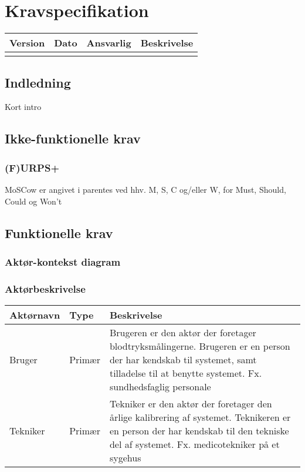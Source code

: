 \chapter{Kravspecifikation}

\begin{longtabu} to 
    Version &    Dato &    Ansvarlig &    Beskrivelse\\[-1ex]
    \midrule
\label{version_Systemark}
\end{longtabu}


\section{Indledning}

Kort intro
\section{Ikke-funktionelle krav}
\subsection{(F)URPS+}
MoSCow er angivet i parentes ved hhv. M, S, C og/eller W, for Must, Should, Could og Won't\\
\section{Funktionelle krav}
\subsection{Aktør-kontekst diagram}
\subsection{Aktørbeskrivelse}
\begin{longtabu}to 
	{\large \textbf{Aktørnavn}} & {\large \textbf{Type}} & {\large \textbf{Beskrivelse}}\\ \toprule
	Bruger & Primær & Brugeren er den aktør der foretager blodtryksmålingerne. Brugeren er en person der har kendskab til systemet, samt tilladelse til at benytte systemet. Fx. sundhedsfaglig personale \\
	Tekniker & Primær & Tekniker er den aktør der foretager den årlige kalibrering af systemet. Teknikeren er en person der har kendskab til den tekniske del af systemet. Fx. medicotekniker på et sygehus\\
	
\end{longtabu}

